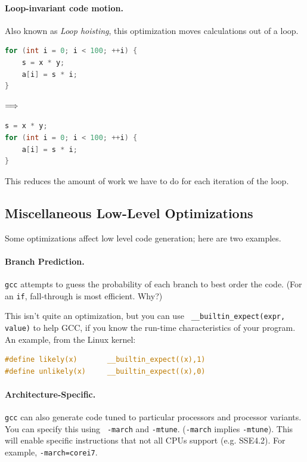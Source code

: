 \documentclass[a4paper]{report}
\begin{document}
\paragraph{Loop-invariant code motion.} Also known as \emph{Loop hoisting},
this optimization moves calculations out of a loop. 
\begin{center}
\vspace*{-1em}
\begin{minipage}{.3\textwidth}
  \begin{lstlisting}[language=C]
for (int i = 0; i < 100; ++i) {
    s = x * y;
    a[i] = s * i;
}
  \end{lstlisting}
  \end{minipage} $\Longrightarrow \hspace*{2em}$ \begin{minipage}{.4\textwidth}
  \begin{lstlisting}[language=C]
s = x * y;
for (int i = 0; i < 100; ++i) {
    a[i] = s * i;
}
  \end{lstlisting}
  \end{minipage}
  \end{center}

This reduces the amount of work we have to do for each iteration of the loop.


\subsection*{Miscellaneous Low-Level Optimizations}
Some optimizations affect low level code generation; here are two examples.

\paragraph{Branch Prediction.} {\tt gcc} attempts to guess the probability of each branch to
best order the code. (For an {\tt if}, fall-through is most efficient. Why?)

This isn't quite an optimization, but you can use {\tt
  \_\_builtin\_expect(expr, value)} to help GCC, if you know the
run-time characteristics of your program. An example, from the
  Linux kernel:

  \begin{lstlisting}[language=C]
#define likely(x)       __builtin_expect((x),1)
#define unlikely(x)     __builtin_expect((x),0)
  \end{lstlisting}

\paragraph{Architecture-Specific.} {\tt gcc} can also generate code tuned to particular
processors and processor variants. You can specify this using {\tt
  -march} and {\tt -mtune}. ({\tt -march} implies {\tt -mtune}).
This will enable specific instructions that not all CPUs support (e.g. SSE4.2).
For example, {\tt -march=corei7}.
\end{document}
